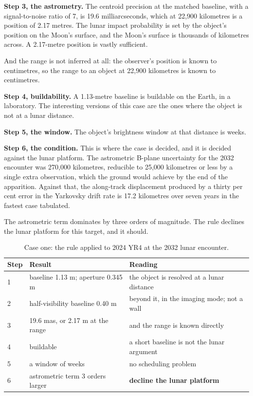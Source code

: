 \textbf{Step 3, the astrometry.} The centroid precision at the matched
baseline, with a signal-to-noise ratio of 7, is 19.6 milliarcseconds, which
at 22,900 kilometres is a position of 2.17 metres. The lunar impact
probability is set by the object's position on the Moon's surface, and the
Moon's surface is thousands of kilometres across. A 2.17-metre position is
vastly sufficient.

And the range is not inferred at all: the observer's position is known to
centimetres, so the range to an object at 22,900 kilometres is known to
centimetres.

\textbf{Step 4, buildability.} A 1.13-metre baseline is buildable on the
Earth, in a laboratory. The interesting versions of this case are the ones
where the object is not at a lunar distance.

\textbf{Step 5, the window.} The object's brightness window at that
distance is weeks.

\textbf{Step 6, the condition.} This is where the case is decided, and it is
decided against the lunar platform. The astrometric B-plane uncertainty for
the 2032 encounter was 270,000 kilometres, reducible to 25,000 kilometres or
less by a single extra observation, which the ground would achieve by the
end of the apparition. Against that, the along-track displacement produced
by a thirty per cent error in the Yarkovsky drift rate is 17.2 kilometres
over seven years in the fastest case tabulated.

The astrometric term dominates by three orders of magnitude. The rule
declines the lunar platform for this target, and it should.

\begin{table}[!htbp]
\centering
\small
\caption{Case one: the rule applied to 2024 YR4 at the 2032 lunar
encounter.}
\label{tab:case1}
\begin{tabularx}{\textwidth}{@{}P{0.61in}P{1.95in}Y@{}}
\toprule
{}
\textbf{Step} & \textbf{Result} & \textbf{Reading} \\
 & baseline 1.13 m; aperture 0.345 m & the object is resolved at a lunar
distance \\
2 & half-visibility baseline 0.40 m & beyond it, in the imaging mode; not a
wall \\
3 & 19.6 mas, or 2.17 m at the range & and the range is known directly \\
4 & buildable & a short baseline is not the lunar argument \\
5 & a window of weeks & no scheduling problem \\
6 & astrometric term 3 orders larger & \textbf{decline the lunar platform} \\
\bottomrule
\end{tabularx}
\end{table}

